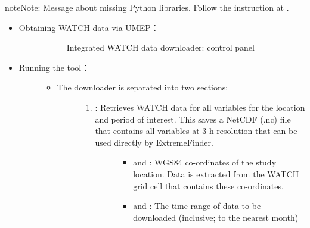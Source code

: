 \documentclass[letterpaper,10pt,english]{sphinxmanual}
\begin{document}
\begin{sphinxadmonition}{note}{Note:}
Message about missing Python libraries. Follow the instruction at {\hyperref[\detokenize{Getting_Started:python-libraries}]{}}.
\end{sphinxadmonition}
\begin{itemize}
\item {} \begin{description}
\item[{Obtaining WATCH data via UMEP：}] \leavevmode
\begin{figure}[htbp]
\centering
\capstart

\noindent{}
\caption{Integrated WATCH data downloader: control panel}\label{\detokenize{pre-processor/Meteorological Data Download data (WATCH):id4}}\end{figure}

\end{description}

\item {} \begin{description}
\item[{Running the tool：}] \leavevmode\begin{itemize}
\item {} \begin{description}
\item[{The downloader is separated into two sections:}] \leavevmode\begin{enumerate}
\item {} \begin{description}
\item[{: Retrieves WATCH data for all variables for the location and period of interest. This saves a NetCDF (.nc) file that contains all variables at 3 h resolution that can be used directly by ExtremeFinder.}] \leavevmode\begin{itemize}
\item {} 
 and : WGS84 co-ordinates of the study location. Data is extracted from the WATCH grid cell that contains these co-ordinates.

\item {} 
 and : The time range of data to be downloaded (inclusive; to the nearest month)

\end{itemize}


\end{description}
\end{enumerate}
\end{description}
\end{itemize}
\end{description}
\end{itemize}
\end{document}
